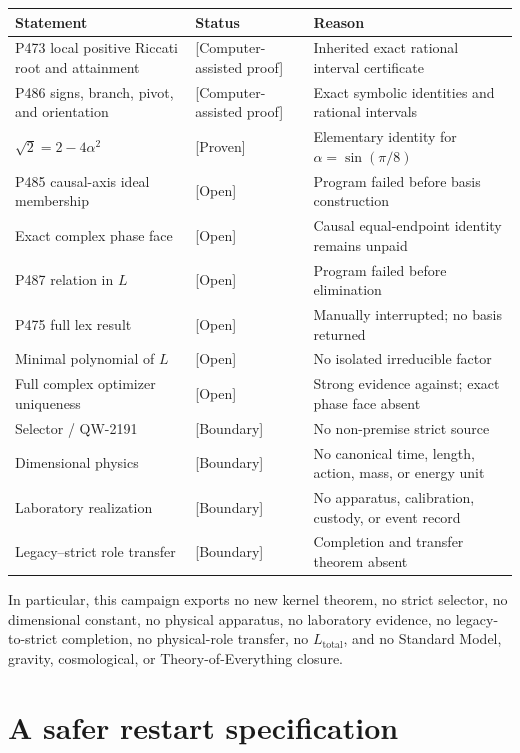 \documentclass[11pt,a4paper,openany]{report}
\newcommand{\statusProven}{\textcolor{fingreen}{[Proven]}}
\newcommand{\statusCAP}{\textcolor{fingreen}{[Computer-assisted proof]}}
\newcommand{\statusOpen}{\textcolor{finorange}{[Open]}}
\newcommand{\statusBoundary}{\textcolor{finviolet}{[Boundary]}}
\begin{document}
\begin{center}\small
\begin{longtable}{@{}p{}p{}p{}@{}}
\toprule
\textbf{Statement} & \textbf{Status} & \textbf{Reason}\\ \midrule\endhead
P473 local positive Riccati root and attainment & \statusCAP{} & Inherited exact rational interval certificate\\
P486 signs, branch, pivot, and orientation & \statusCAP{} & Exact symbolic identities and rational intervals\\
\(\sqrt2=2-4\alpha^2\) & \statusProven{} & Elementary identity for \(\alpha=\sin(\pi/8)\)\\
P485 causal-axis ideal membership & \statusOpen{} & Program failed before basis construction\\
Exact complex phase face & \statusOpen{} & Causal equal-endpoint identity remains unpaid\\
P487 relation in \(L\) & \statusOpen{} & Program failed before elimination\\
P475 full lex result & \statusOpen{} & Manually interrupted; no basis returned\\
Minimal polynomial of \(L\) & \statusOpen{} & No isolated irreducible factor\\
Full complex optimizer uniqueness & \statusOpen{} & Strong evidence against; exact phase face absent\\
Selector / QW-2191 & \statusBoundary{} & No non-premise strict source\\
Dimensional physics & \statusBoundary{} & No canonical time, length, action, mass, or energy unit\\
Laboratory realization & \statusBoundary{} & No apparatus, calibration, custody, or event record\\
Legacy--strict role transfer & \statusBoundary{} & Completion and transfer theorem absent\\
\bottomrule
\end{longtable}
\end{center}

In particular, this campaign exports no new kernel theorem, no strict
selector, no dimensional constant, no physical apparatus, no laboratory
evidence, no legacy-to-strict completion, no physical-role transfer, no
\(L_{\mathrm{total}}\), and no Standard Model, gravity, cosmological, or
Theory-of-Everything closure.

\chapter{A safer restart specification}
\end{document}
